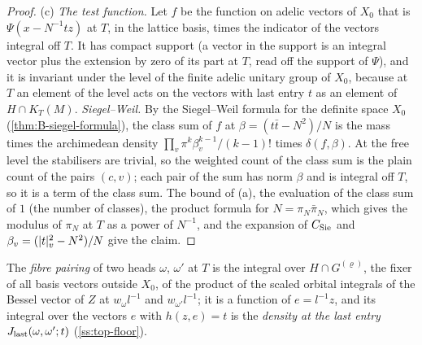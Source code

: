 \begin{proof}
(c) \emph{The test function.} Let $f$ be the function on adelic vectors of $X_0$ that is $\Psi(x-N^{-1}tz)$ at $T$, in the lattice basis, times the indicator of the vectors integral off $T$. It has compact support (a vector
in the support is an integral vector plus the extension by zero of its part at $T$, read off the support of $\Psi$), and it is invariant under the level of the finite adelic unitary group of $X_0$, because at $T$ an
element of the level acts on the vectors with last entry $t$ as an element of $H\cap K_T(M)$. \emph{Siegel--Weil.} By the Siegel--Weil formula for the definite space $X_0$ (\cref{thm:B-siegel-formula}), the class sum of $f$ at
$\beta=(t\bar t-N^2)/N$ is the mass times the archimedean density $\prod_v\pi^k\beta_v^{k-1}/(k-1)!$ times $\delta(f,\beta)$. At the free level the stabilisers are trivial, so the weighted count of the class sum is the plain
count of the pairs $(c,v)$; each pair of the sum has norm $\beta$ and is integral off $T$, so it is a term of the class sum. The bound of (a), the evaluation of the class sum of $1$ (the number of classes), the product
formula for $N=\pi_N\bar\pi_N$, which gives the modulus of $\pi_N$ at $T$ as a power of $N^{-1}$, and the expansion of $C_{\rm Sie}$ and $\beta_v=(\lvert t\rvert_v^2-N^2)/N$ give the claim.
\end{proof}

The \emph{fibre pairing} of two heads $\omega$, $\omega'$ at $T$ is the integral over $H\cap G^{(\varrho)}$, the fixer of all basis vectors outside $X_0$, of the product of the scaled orbital integrals of the
Bessel vector of $Z$ at $w_\omega l^{-1}$ and $w_{\omega'}l^{-1}$; it is a function of $e=l^{-1}z$, and its integral over the vectors $e$ with $h(z,e)=t$ is the \emph{density at the last entry}
$J_{\rm last}(\omega,\omega';t)$ (\cref{ss:top-floor}).

